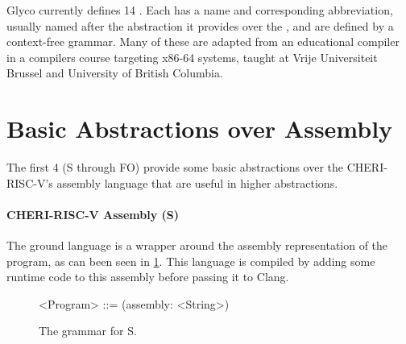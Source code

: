 \documentclass[main.tex]{subfiles}
\begin{document}
Glyco currently defines 14 \ils{}. Each \il{} has a name and corresponding abbreviation, usually named after the abstraction it provides over the \lowerlang{}, and are defined by a context-free grammar. Many of these \ils{} are adapted from an educational compiler in a compilers course targeting x86-64 systems, taught at Vrije Universiteit Brussel \cite{:compcourse} and University of British Columbia.

\section{Basic Abstractions over Assembly}

The first 4 \ils{} (S through FO) provide some basic abstractions over the CHERI-RISC-V's assembly language that are useful in higher abstractions.

\paragraph{CHERI-RISC-V Assembly (S)} The ground language is a wrapper around the assembly representation of the program, as can been seen in \cref{bnf:s}. This language is compiled by adding some runtime code to this assembly before passing it to Clang.
\begin{figure}[ht]
	\begin{grammar}
		<Program> ::= (assembly: <String>)
	\end{grammar}
	\caption{The grammar for S.}
	\label{bnf:s}
\end{figure}
\end{document}
